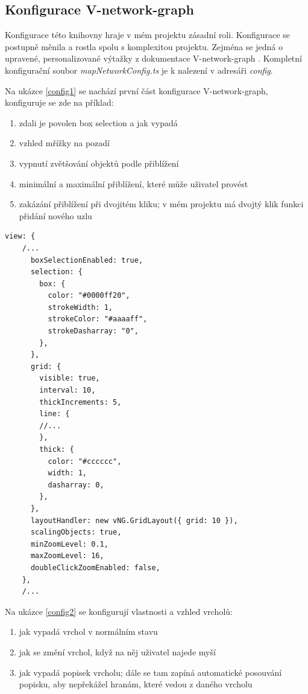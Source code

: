 \subsection{Konfigurace V-network-graph}
\label{config}
Konfigurace této knihovny hraje v mém projektu zásadní roli. Konfigurace se postupně měnila a rostla spolu s komplexitou projektu. Zejména se jedná o upravené, personalizované výtažky z dokumentace V-network-graph \cite{vnetexamples}. Kompletní konfigurační soubor \textit{mapNetworkConfig.ts} je k nalezení v adresáři \textit{config}.
\par
Na ukázce \ref{config1} se nachází první část konfigurace V-network-graph, konfiguruje se zde na příklad:
\begin{enumerate}
    \item zdali je povolen box selection a jak vypadá
    \item vzhled mřížky na pozadí
    \item vypnutí zvětšování objektů podle přiblížení
    \item minimální a maximální přiblížení, které může uživatel provést
    \item zakázání přiblížení při dvojitém kliku; v mém projektu má dvojtý klik funkci přidání nového uzlu
\end{enumerate}
\begin{lstlisting}[style=JavaScript, firstnumber = 56, caption={config/mapNetworkConfig.ts, první část konfigurace vNG},
label = {config1}]
view: {
    /...
      boxSelectionEnabled: true,
      selection: {
        box: {
          color: "#0000ff20",
          strokeWidth: 1,
          strokeColor: "#aaaaff",
          strokeDasharray: "0",
        },
      },
      grid: {
        visible: true,
        interval: 10,
        thickIncrements: 5,
        line: {
        //...
        },
        thick: {
          color: "#cccccc",
          width: 1,
          dasharray: 0,
        },
      },
      layoutHandler: new vNG.GridLayout({ grid: 10 }),
      scalingObjects: true,
      minZoomLevel: 0.1,
      maxZoomLevel: 16,
      doubleClickZoomEnabled: false,
    },
    /...
\end{lstlisting}
Na ukázce \ref{config2} se konfigurují vlastnosti a vzhled vrcholů:
\begin{enumerate}
    \item jak vypadá vrchol v normálním stavu
    \item jak se změní vrchol, když na něj uživatel najede myší
    \item jak vypadá popisek vrcholu; dále se tam zapíná automatické posouvání popisku, aby nepřekážel hranám, které vedou z daného vrcholu
\end{enumerate}
